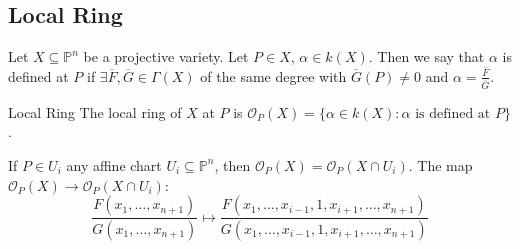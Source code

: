\documentclass{report}
\begin{document}
\begin{topic}
    \section{Local Ring}
\end{topic}

\begin{definition}{}
    Let $X \subseteq \mathbb{P}^{n}$ be a projective variety. Let $P \in X$, $\alpha \in k(X)$. Then we say that $\alpha$ is defined at $P$ if $\exists \overline{F}, \overline{G} \in \Gamma (X)$ of the same degree with $\overline{G}(P) \neq 0$ and $\alpha = \frac{\overline{F}}{\overline{G}}$.
\end{definition}

\begin{definition}{Local Ring}
    The local ring of $X$ at $P$ is $\mathcal{O}_{P}(X) = \{\alpha \in k(X) : \alpha \text{ is defined at } P\}$.
\end{definition}

If $P \in U_{i}$ any affine chart $U_{i} \subseteq \mathbb{P}^{n}$, then $\mathcal{O}_{P}(X) = \mathcal{O}_{P}(X \cap U_{i})$. The map $\mathcal{O}_{P}(X) \rightarrow \mathcal{O}_{P}(X \cap U_{i})$:
    \begin{equation*}
        \dfrac{F(x_{1}, \ldots, x_{n + 1})}{G(x_{1} , \ldots, x_{n + 1})} \mapsto\dfrac{F(x_{1}, \ldots, x_{i - 1}, 1, x_{i + 1}, \ldots, x_{n + 1})}{G(x_{1}, \ldots, x_{i - 1}, 1, x_{i + 1}, \ldots, x_{n + 1})}
    \end{equation*}
\end{document}
